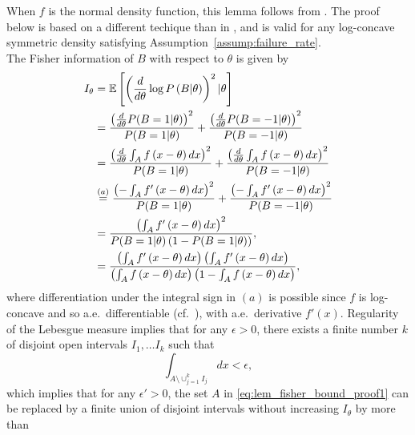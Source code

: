 \begin{proof-of-lemma}[\ref{lem:fisher_bound}]  
  When $f$ is the normal density function, this lemma follows from
  \cite[Thm.~3]{Barnes2018}. The proof below is based on a different techique
  than in \cite{Barnes2018}, and is valid for any log-concave symmetric
  density satisfying Assumption~\ref{assump:failure_rate}. \\

  The Fisher information of $B$ with respect to $\theta$ is given by
  \begin{align}
    I_\theta & =  \mathbb{E}\left[  \left( \frac{d}{d\theta} \log P\left( B | \theta \right) \right)^2 |\theta \right] \nonumber \\
    & = \frac{ \left(\frac{d}{d\theta} P(B=1|\theta) \right)^2}{P(B=1| \theta)} + \frac{ \left(\frac{d}{d\theta} P(B=-1|\theta) \right)^2} {P(B=-1| \theta)} \nonumber \\
    & =  \frac{ \left( \frac{d}{d\theta} \int_A f \left( x-\theta\right)dx \right)^2} { P(B=1| \theta) } + \frac{ \left( \frac{d}{d\theta}\int_A f \left( x-\theta \right)dx \right)^2} { P(B=-1| \theta) } \nonumber \\ 
    & \overset{(a)}{=} \frac{ \left( - \int_A f' \left( x-\theta \right)dx \right)^2} { P(B=1| \theta) } + \frac{ \left(- \int_A f' \left( x-\theta \right)dx \right)^2} { P(B=-1| \theta) } \nonumber \\ 
    & = \frac{\left( \int_A f'\left( x-\theta \right) dx \right)^2 }{  P(B=1 | \theta) \left(1-P(B=1|\theta) \right)  }, \nonumber \\
    & = \frac{\left( \int_A f'\left( x-\theta \right) dx \right) \left( \int_A f'\left( x-\theta \right) dx \right)}{ \left( \int_A f \left( x-\theta \right) dx \right)  \left(1- \int_A f \left( x-\theta \right) dx \right) }, \label{eq:lem_fisher_bound_proof1}
  \end{align}
  where differentiation under the integral sign in $(a)$ is possible since
  $f$ is log-concave and so a.e.\ differentiable
  (cf.~\cite{Bertsekas73}),
  with a.e.\ derivative $f'(x)$. Regularity of
  the Lebesgue measure implies that for any $\epsilon>0$, there exists a
  finite number $k$ of disjoint open intervals $I_1,\ldots I_k$ such that
  \begin{equation*}
    \int_{A\setminus \cup_{j=1}^k I_j }  dx < \epsilon,
  \end{equation*}
  which implies that for any $\epsilon' > 0$, the set $A$ in
  \eqref{eq:lem_fisher_bound_proof1} can be replaced by a finite union of
  disjoint intervals without increasing $I_\theta$ by more than

\end{proof-of-lemma}

